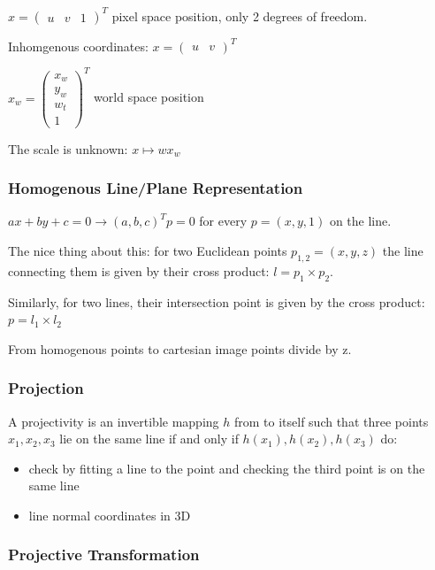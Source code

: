 $x = \left(\begin{matrix} u & v & 1 \end{matrix}\right)^T$ pixel space position, only 2 degrees of freedom.

Inhomgenous coordinates: $x = (\begin{matrix} u & v \end{matrix})^T $

$ x_w = \left( \begin{matrix} x_w \\  y_w \\ w_t\\  1 \end{matrix} \right)^T $ world space position

The scale is unknown: $x \mapsto  w x_w$

\subsubsection{Homogenous Line/Plane Representation}

$ax+by+c = 0 \to (a,b,c)^T p = 0$ for every $p = (x,y,1)$ on the line.

The nice thing about this: for two Euclidean points $p_{1,2} = (x,y,z) $ the line connecting them is given by their cross product: $l = p_1 \times p_2$. 

Similarly, for two lines, their intersection point is given by the cross product: 
$p = l_1 \times l_2$

From homogenous points to cartesian image points divide by z. 


\subsubsection{Projection}

A projectivity is an invertible mapping $h$ from  to itself such that three points $x_1 , x_2 , x_3$ lie on the same line if and only if $h(x_1), h(x_2 ), h(x_3)$ do:

\begin{itemize}
\item check by fitting a line to the point and checking the third point is on the same line
\item line normal coordinates in 3D
\end{itemize}

\subsubsection{Projective Transformation}

